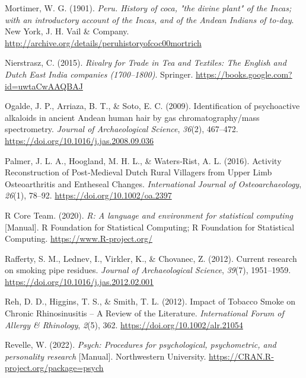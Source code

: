 \documentclass[
  letterpaper,
]{book}
\newlength{\cslhangindent}
\newlength{\cslentryspacingunit} %
\newenvironment{CSLReferences}[2] %
 {%
  \setlength{\parindent}{0pt}
  \ifodd #1
  \let\oldpar\par
  \def\par{\hangindent=\cslhangindent\oldpar}
  \fi
  \setlength{\parskip}{#2\cslentryspacingunit}
 }%
 {}
\begin{document}
\begin{CSLReferences}{1}{0}
\leavevmode{}%
Mortimer, W. G. (1901). \emph{Peru. {History} of coca, "the divine
plant" of the {Incas}; with an introductory account of the {Incas}, and
of the {Andean Indians} of to-day}. {New York, J. H. Vail \& Company}.
\url{http://archive.org/details/peruhistoryofcoc00mortrich}

\leavevmode{}%
Nierstrasz, C. (2015). \emph{Rivalry for {Trade} in {Tea} and
{Textiles}: {The English} and {Dutch East India} companies
(1700--1800)}. {Springer}.
\url{https://books.google.com?id=uwtaCwAAQBAJ}

\leavevmode{}%
Ogalde, J. P., Arriaza, B. T., \& Soto, E. C. (2009). Identification of
psychoactive alkaloids in ancient {Andean} human hair by gas
chromatography/mass spectrometry. \emph{Journal of Archaeological
Science}, \emph{36}(2), 467--472.
\url{https://doi.org/10.1016/j.jas.2008.09.036}

\leavevmode{}%
Palmer, J. L. A., Hoogland, M. H. L., \& Waters‐Rist, A. L. (2016).
Activity {Reconstruction} of {Post}‐{Medieval Dutch Rural Villagers}
from {Upper Limb Osteoarthritis} and {Entheseal Changes}.
\emph{International Journal of Osteoarchaeology}, \emph{26}(1), 78--92.
\url{https://doi.org/10.1002/oa.2397}

\leavevmode{}%
R Core Team. (2020). \emph{R: {A} language and environment for
statistical computing} {[}Manual{]}. {R Foundation for Statistical
Computing}; {R Foundation for Statistical Computing}.
\url{https://www.R-project.org/}

\leavevmode{}%
Rafferty, S. M., Lednev, I., Virkler, K., \& Chovanec, Z. (2012).
Current research on smoking pipe residues. \emph{Journal of
Archaeological Science}, \emph{39}(7), 1951--1959.
\url{https://doi.org/10.1016/j.jas.2012.02.001}

\leavevmode{}%
Reh, D. D., Higgins, T. S., \& Smith, T. L. (2012). Impact of {Tobacco
Smoke} on {Chronic Rhinosinusitis} -- {A Review} of the {Literature}.
\emph{International Forum of Allergy \& Rhinology}, \emph{2}(5), 362.
\url{https://doi.org/10.1002/alr.21054}

\leavevmode{}%
Revelle, W. (2022). \emph{Psych: {Procedures} for psychological,
psychometric, and personality research} {[}Manual{]}. {Northwestern
University}. \url{https://CRAN.R-project.org/package=psych}


\end{CSLReferences}
\end{document}
